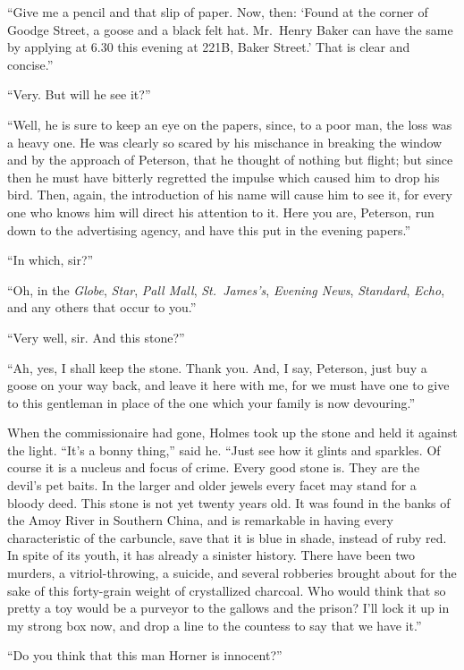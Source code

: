 “Give me a pencil and that slip of paper. Now, then:
‘Found at the corner of Goodge Street, a goose and a black felt
hat. Mr.~Henry Baker can have the same by applying at 6.30
this evening at 221\textsc{B}, Baker Street.’ That is clear and concise.”

“Very. But will he see it?”

“Well, he is sure to keep an eye on the papers, since, to a
poor man, the loss was a heavy one. He was clearly so scared
by his mischance in breaking the window and by the approach
of Peterson, that he thought of nothing but flight; but
since then he must have bitterly regretted the impulse which
caused him to drop his bird. Then, again, the introduction of
his name will cause him to see it, for every one who knows
him will direct his attention to it. Here you are, Peterson,
run down to the advertising agency, and have this put in the
evening papers.”

“In which, sir?”

“Oh, in the \textit{Globe}, \textit{Star}, \textit{Pall Mall}, \textit{St.~James’s}, \textit{Evening
News}, \textit{Standard}, \textit{Echo}, and any others that occur to you.”

“Very well, sir. And this stone?”

“Ah, yes, I shall keep the stone. Thank you. And, I say,
Peterson, just buy a goose on your way back, and leave it
here with me, for we must have one to give to this gentleman
in place of the one which your family is now devouring.”

When the commissionaire had gone, Holmes took up the
stone and held it against the light. “It’s a bonny thing,”
said he. “Just see how it glints and sparkles. Of course it
is a nucleus and focus of crime. Every good stone is. They
are the devil’s pet baits. In the larger and older jewels every
facet may stand for a bloody deed. This stone is not yet
twenty years old. It was found in the banks of the Amoy
River in Southern China, and is remarkable in having every
characteristic of the carbuncle, save that it is blue in shade,
instead of ruby red. In spite of its youth, it has already a
sinister history. There have been two murders, a vitriol-throwing,
a suicide, and several robberies brought about for
the sake of this forty-grain weight of crystallized charcoal.
Who would think that so pretty a toy would be a purveyor to
the gallows and the prison? I’ll lock it up in my strong
box now, and drop a line to the countess to say that we
have it.”

“Do you think that this man Horner is innocent?”

